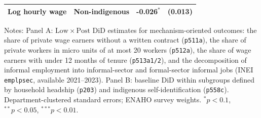 \begin{table}[!tbp]
\begin{threeparttable}
\begin{tabular}{lccc}
Log hourly wage & Non-indigenous & -0.026$^{*}$ & (0.013) \\
\bottomrule
\end{tabular}
\begin{tablenotes}\footnotesize
\item Notes: Panel A: $\mathrm{Low}\times\mathrm{Post}$ DiD estimates for mechanism-oriented outcomes: the share of private wage earners without a written contract (\texttt{p511a}), the share of private workers in micro units of at most 20 workers (\texttt{p512a}), the share of wage earners with under 12 months of tenure (\texttt{p513a1/2}), and the decomposition of informal employment into informal-sector and formal-sector informal jobs (INEI \texttt{emplpsec}, available 2021--2023). Panel B: baseline DiD within subgroups defined by household headship (\texttt{p203}) and indigenous self-identification (\texttt{p558c}). Department-clustered standard errors; ENAHO survey weights. $^{*}p<0.1$, $^{**}p<0.05$, $^{***}p<0.01$.
\end{tablenotes}
\end{threeparttable}\end{table}
